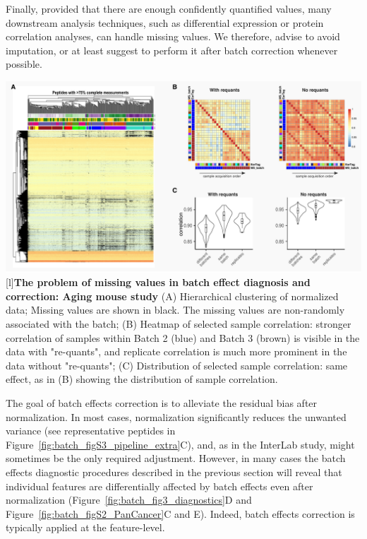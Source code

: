 \documentclass[num-refs]{wiley-article}
\begin{document}
{\begin{tcolorbox}
		Finally, provided that there are enough confidently quantified values, many downstream analysis techniques, such as differential expression or protein correlation analyses, can handle missing values. We therefore, advise to avoid imputation, or at least suggest to perform it after batch correction whenever possible. 

		
		\begin{minipage}[h]{\linewidth}
			\includegraphics[width=.99\textwidth]{figures/Fig4_missing_values2.pdf}
			\vspace{-.31cm}
			[l]{\textbf{The problem of missing values in batch effect diagnosis and correction: Aging mouse study} }
			\label{fig:batch_fig4_missing_values}
			{\footnotesize  (A) Hierarchical clustering of normalized data; Missing values are shown in black. The missing values are non-randomly associated with the batch; (B) Heatmap of selected sample correlation: stronger correlation of samples within Batch 2 (blue) and Batch 3 (brown) is visible in the data with "re-quants", and replicate correlation is much more prominent in the data without "re-quants";	(C) Distribution of selected sample correlation: same effect, as in (B) showing the distribution of sample correlation.}
		\end{minipage}
	\end{tcolorbox}
	\clearpage
}

The goal of batch effects correction is to alleviate the residual bias after normalization. In most cases, normalization significantly reduces the unwanted variance (see representative peptides in Figure~\ref{fig:batch_figS3_pipeline_extra}C), and, as in the InterLab study, might sometimes be the only required adjustment. However, in many cases the batch effects diagnostic procedures described in the previous section will reveal that individual features are differentially affected by batch effects even after normalization (Figure~\ref{fig:batch_fig3_diagnostics}D and Figure~\ref{fig:batch_figS2_PanCancer}C and E). Indeed, batch effects correction is typically applied at the feature-level.
\end{document}
